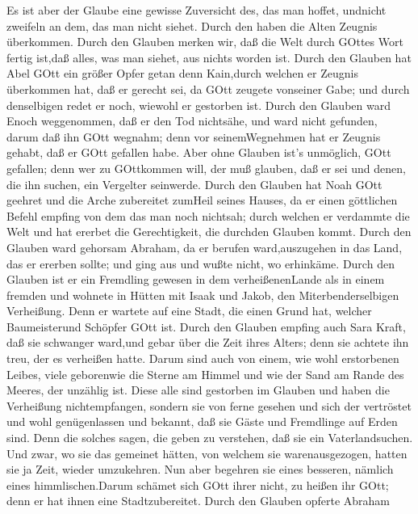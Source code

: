 Es ist aber der Glaube eine gewisse Zuversicht des, das man
hoffet, undnicht zweifeln an dem, das man nicht siehet. 
Durch den haben die Alten Zeugnis überkommen.  Durch den
Glauben merken wir, daß die Welt durch GOttes Wort fertig ist,daß alles,
was man siehet, aus nichts worden ist.  Durch den Glauben
hat Abel GOtt ein größer Opfer getan denn Kain,durch welchen er Zeugnis
überkommen hat, daß er gerecht sei, da GOtt zeugete vonseiner Gabe; und
durch denselbigen redet er noch, wiewohl er gestorben ist. 
Durch den Glauben ward Enoch weggenommen, daß er den Tod nichtsähe, und
ward nicht gefunden, darum daß ihn GOtt wegnahm; denn vor
seinemWegnehmen hat er Zeugnis gehabt, daß er GOtt gefallen habe.
 Aber ohne Glauben ist's unmöglich, GOtt gefallen; denn wer
zu GOttkommen will, der muß glauben, daß er sei und denen, die ihn
suchen, ein Vergelter seinwerde.  Durch den Glauben hat Noah
GOtt geehret und die Arche zubereitet zumHeil seines Hauses, da er einen
göttlichen Befehl empfing von dem das man noch nichtsah; durch welchen
er verdammte die Welt und hat ererbet die Gerechtigkeit, die durchden
Glauben kommt.  Durch den Glauben ward gehorsam Abraham, da
er berufen ward,auszugehen in das Land, das er ererben sollte; und ging
aus und wußte nicht, wo erhinkäme.  Durch den Glauben ist er
ein Fremdling gewesen in dem verheißenenLande als in einem fremden und
wohnete in Hütten mit Isaak und Jakob, den Miterbenderselbigen
Verheißung.  Denn er wartete auf eine Stadt, die einen
Grund hat, welcher Baumeisterund Schöpfer GOtt ist.  Durch
den Glauben empfing auch Sara Kraft, daß sie schwanger ward,und gebar
über die Zeit ihres Alters; denn sie achtete ihn treu, der es verheißen
hatte.  Darum sind auch von einem, wie wohl erstorbenen
Leibes, viele geborenwie die Sterne am Himmel und wie der Sand am Rande
des Meeres, der unzählig ist.  Diese alle sind gestorben im
Glauben und haben die Verheißung nichtempfangen, sondern sie von ferne
gesehen und sich der vertröstet und wohl genügenlassen und bekannt, daß
sie Gäste und Fremdlinge auf Erden sind.  Denn die solches
sagen, die geben zu verstehen, daß sie ein Vaterlandsuchen.
 Und zwar, wo sie das gemeinet hätten, von welchem sie
warenausgezogen, hatten sie ja Zeit, wieder umzukehren. 
Nun aber begehren sie eines besseren, nämlich eines himmlischen.Darum
schämet sich GOtt ihrer nicht, zu heißen ihr GOtt; denn er hat ihnen
eine Stadtzubereitet.  Durch den Glauben opferte Abraham
